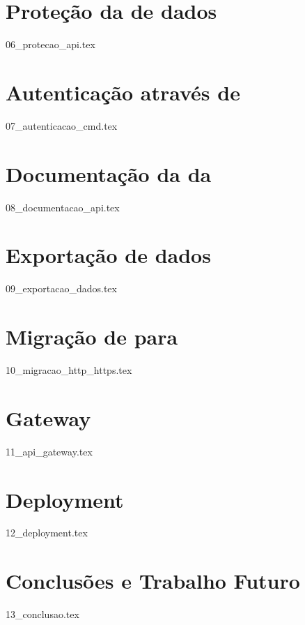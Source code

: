 \documentclass[
  oneside,
  12pt, a4paper,
  footinclude=true,
  headinclude=true,
  cleardoublepage=empty
]{scrbook}
\begin{document}
    \chapter{Proteção da  de dados}\label{cap:prot_api}
    {06_protecao_api.tex}

    \chapter{Autenticação através de }\label{cap:cmd}
    {07_autenticacao_cmd.tex}

    \chapter{Documentação da  da }\label{cap:doc}
    {08_documentacao_api.tex}

	\chapter{Exportação de dados}\label{cap:exp}
    {09_exportacao_dados.tex}

    \chapter{Migração de  para }\label{cap:https}
    {10_migracao_http_https.tex}

    \chapter{ Gateway}\label{cap:api_gateway}
    {11_api_gateway.tex}

	\chapter{Deployment}\label{cap:deploy}
    {12_deployment.tex}
		
	\chapter{Conclusões e Trabalho Futuro}\label{cap:conc}
    {13_conclusao.tex}
			
\end{document}
